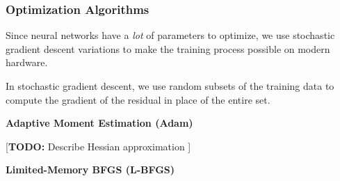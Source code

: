\begin{frame}
    \frametitle{Optimization Algorithms}

    Since neural networks have a \textit{lot} of parameters to optimize, we use stochastic gradient descent variations 
    to make the training process possible on modern hardware.

    \bigskip
    \pause

    In stochastic gradient descent, we use random subsets of the training data to compute the gradient of the residual
    in place of the entire set.

    \bigskip
    \pause

    \textbf{Adaptive Moment Estimation (Adam)}
    \ \\
    \bigskip

    [\textbf{TODO:} Describe Hessian approximation ]

    \pause
    \bigskip

    \textbf{Limited-Memory BFGS (L-BFGS)}
    \ \\
\end{frame}